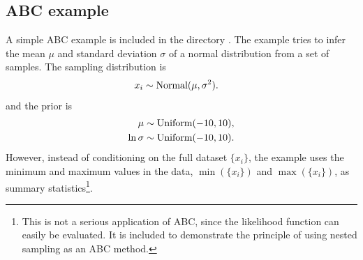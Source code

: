 \documentclass[article]{jss}
\begin{document}
\subsection{ABC example}
A simple ABC example is included in the directory
. The example tries to infer the mean
$\mu$ and standard deviation $\sigma$ of a normal distribution
from a set of samples. The sampling distribution is
\begin{align*}
x_i &\sim \textnormal{Normal}(\mu, \sigma^2).
\end{align*}
and the prior is
\begin{align*}
\mu &\sim \textnormal{Uniform}(-10, 10),\\
\ln\sigma &\sim \textnormal{Uniform}(-10, 10).
\end{align*}
However, instead of conditioning on the full dataset $\{x_i\}$, the example
uses the minimum and maximum values in the data,
$\min(\{x_i\})$ and $\max(\{x_i\})$, as summary statistics\footnote{This is
not a serious application of ABC, since the likelihood function can easily
be evaluated. It is included to demonstrate the principle of using
nested sampling as an ABC method.}.
\end{document}
